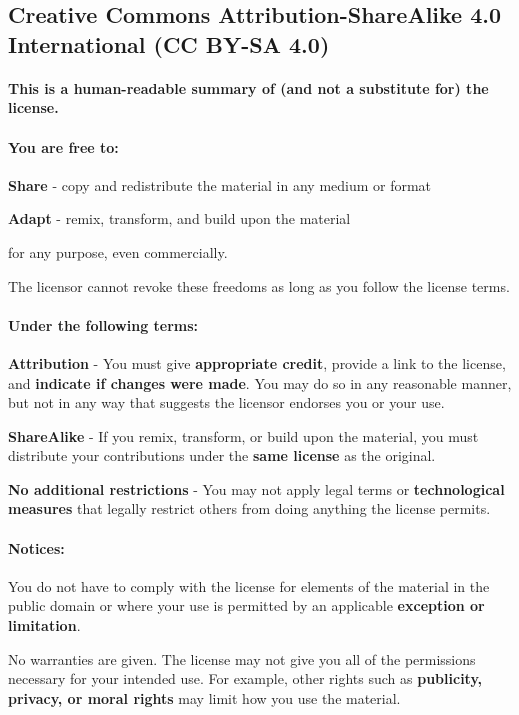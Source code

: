 \documentclass[]{article}
\date{}
\let\oldparagraph\paragraph
\renewcommand{\paragraph}[1]{\oldparagraph{#1}\mbox{}}
\begin{document}
\subsection{Creative Commons Attribution-ShareAlike 4.0 International
(CC BY-SA
4.0)}\label{creative-commons-attribution-sharealike-4.0-international-cc-by-sa-4.0}

\paragraph{This is a human-readable summary of (and not a substitute
for) the
license.}\label{this-is-a-human-readable-summary-of-and-not-a-substitute-for-the-license.}

\paragraph{You are free to:}\label{you-are-free-to}

\textbf{Share} - copy and redistribute the material in any medium or
format

\textbf{Adapt} - remix, transform, and build upon the material

for any purpose, even commercially.

The licensor cannot revoke these freedoms as long as you follow the
license terms.

\paragraph{Under the following terms:}\label{under-the-following-terms}

\textbf{Attribution} - You must give \textbf{appropriate credit},
provide a link to the license, and \textbf{indicate if changes were
made}. You may do so in any reasonable manner, but not in any way that
suggests the licensor endorses you or your use.

\textbf{ShareAlike} - If you remix, transform, or build upon the
material, you must distribute your contributions under the \textbf{same
license} as the original.

\textbf{No additional restrictions} - You may not apply legal terms or
\textbf{technological measures} that legally restrict others from doing
anything the license permits.

\paragraph{Notices:}\label{notices}

You do not have to comply with the license for elements of the material
in the public domain or where your use is permitted by an applicable
\textbf{exception or limitation}.

No warranties are given. The license may not give you all of the
permissions necessary for your intended use. For example, other rights
such as \textbf{publicity, privacy, or moral rights} may limit how you
use the material.
\end{document}
